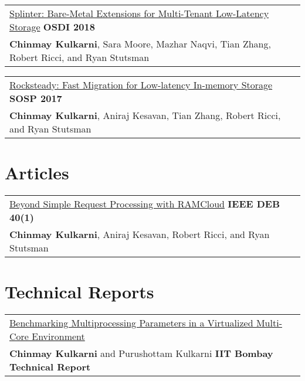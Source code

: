 \documentclass[margin,line]{res}
\begin{document}
\begin{resume}
 \vspace{-7pt}
 \begin{tabular}{@{}p{5.5in}p{4in}}
 \href{http://utah.systems/projects/kulkarni\_splinter}{Splinter:
 Bare-Metal Extensions for Multi-Tenant Low-Latency Storage} \hfill
 {\small\bf OSDI 2018}\\
 {\small{\bf Chinmay Kulkarni}, Sara Moore, Mazhar Naqvi, Tian Zhang, Robert
 Ricci, and Ryan Stutsman}\\
 \end{tabular}

 \vspace{-7pt}
 \begin{tabular}{@{}p{5.5in}p{4in}}
 \href{http://utah.systems/projects/kulkarni\_rocksteady}{Rocksteady: Fast
 Migration for Low-latency In-memory Storage} \hfill
 {\small\bf SOSP 2017}\\
 {\small{\bf Chinmay Kulkarni}, Aniraj Kesavan, Tian Zhang, Robert
 Ricci, and Ryan Stutsman}\\
 \end{tabular}

\section{\sc Articles}
\begin{tabular}{@{}p{5.5in}p{4in}}
\href{http://sites.computer.org/debull/A17mar/p62.pdf}{Beyond Simple
Request Processing with RAMCloud} \hfill
{\small\bf IEEE DEB 40(1)}\\
{\small {\bf Chinmay Kulkarni}, Aniraj Kesavan, Robert Ricci, and Ryan
Stutsman}\\
\end{tabular}

\section{\sc Technical Reports}
\begin{tabular}{@{}p{5.5in}p{4in}}
\href{https://chinkulkarni.github.io/public/TR-CSE-2015-76.pdf}
{Benchmarking Multiprocessing Parameters in a Virtualized Multi-Core
Environment}\\
{\small{\bf Chinmay Kulkarni} and Purushottam Kulkarni} \hfill
{\small\bf IIT Bombay Technical Report}\\
\end{tabular}


\end{resume}
\end{document}
